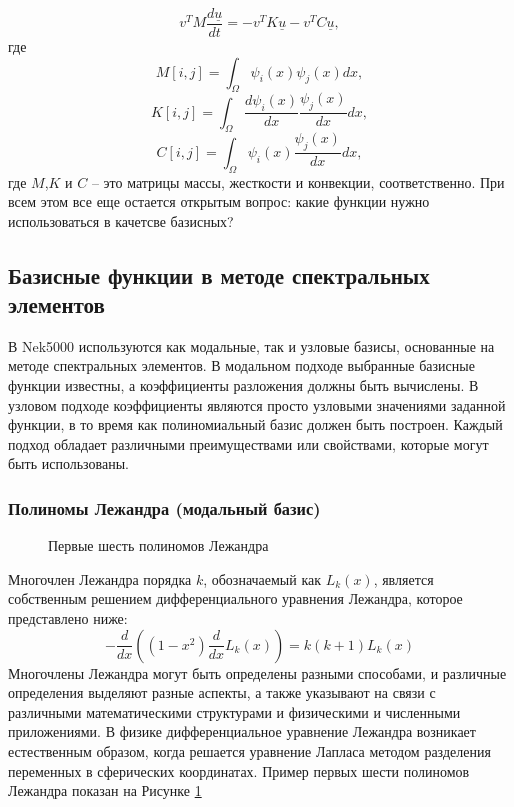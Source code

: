 %
\begin{equation}\label{galerkin_matrix}
    v^T M \frac{d\underline{u}}{dt} = -v^T K \underline{u} - v^TC\underline{u},
\end{equation}
%
где
%
\begin{equation}\label{galerkin_matrix2}
    M[i,j] = \int_\Omega \psi_i(x) \psi_j(x) dx,
\end{equation}
%
\begin{equation}\label{galerkin_matrix3}
    K[i,j] = \int_\Omega  \frac{d \psi_i(x)}{dx} \frac{\psi_j(x)}{dx} dx,
\end{equation}
%
\begin{equation}\label{galerkin_matrix4}
    C[i,j] = \int_\Omega \psi_i(x) \frac{\psi_j(x)}{dx} dx,
\end{equation}
%
где $M$,$K$ и $C$ -- это матрицы массы, жесткости и конвекции, соответственно.
%
При всем этом все еще остается открытым вопрос: какие функции нужно использоваться в качетсве базисных?

\subsection{Базисные функции в методе спектральных элементов}
%
В Nek5000 используются как модальные, так и узловые базисы, основанные на методе спектральных элементов.
%
В модальном подходе выбранные базисные функции известны, а коэффициенты разложения должны быть вычислены. 
%
В узловом подходе коэффициенты являются просто узловыми значениями заданной функции, в то время как полиномиальный базис должен быть построен. 
%
Каждый подход обладает различными преимуществами или свойствами, которые могут быть использованы.
%
\subsubsection{Полиномы Лежандра (модальный базис)}


\begin{figure}[!h]
    \caption{Первые шесть полиномов Лежандра}\label{fig:pols}
\end{figure}

%
Многочлен Лежандра порядка $k$, обозначаемый как $L_k(x)$, является собственным решением дифференциального уравнения Лежандра, которое представлено ниже:
\begin{equation*}
-\frac{d}{dx}((1-x^2)\frac{d}{dx}L_k(x)) = k(k+1)L_k(x)
\end{equation*}
%
Многочлены Лежандра могут быть определены разными способами, и различные определения выделяют разные аспекты, 
а также указывают на связи с различными математическими структурами и физическими и численными приложениями. 
%
В физике дифференциальное уравнение Лежандра возникает естественным образом, 
когда решается уравнение Лапласа методом разделения переменных в сферических координатах.
%
Пример первых шести полиномов Лежандра показан на Рисунке \ref{fig:pols} 


